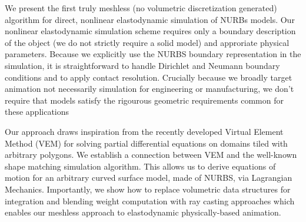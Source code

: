 We present the first truly meshless (no volumetric discretization generated) algorithm for direct, nonlinear elastodynamic simulation of NURBs models. 
Our nonlinear elastodynamic simulation scheme requires only a boundary description of the object (we do not strictly require a solid model) and
approriate physical parameters.  
Because we explicitly use the NURBS boundary representation in the simulation, it is straightforward to handle
Dirichlet and Neumann boundary conditions and to apply contact resolution. 
Crucially because we broadly target animation not necessarily simulation for engineering or manufacturing, we don't require that models
satisfy the rigourous geometric requirements common for these applications

Our approach draws inspiration from the recently developed Virtual Element Method (VEM) for solving partial differential equations on domains tiled with arbitrary polygons.
We establish a connection between VEM and the well-known shape matching simulation algorithm. This allows us 
to derive equations of motion for an arbitrary curved surface model, made of NURBS, via Lagrangian Mechanics. 
Importantly, we show how to replace volumetric data structures for integration and blending weight computation with ray casting approaches which enables
our meshless approach to elastodynamic physically-based animation.

